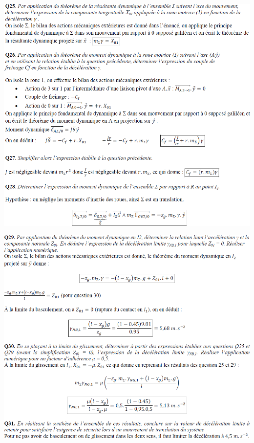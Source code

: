 \documentclass[10pt,fleqn]{article} %
\begin{document}
\newpage

\begin{center}
\includegraphics[width=.8\linewidth]{images/cor_01}
\end{center}

\begin{center}
\includegraphics[width=.8\linewidth]{images/cor_02}
\end{center}
\end{document}
